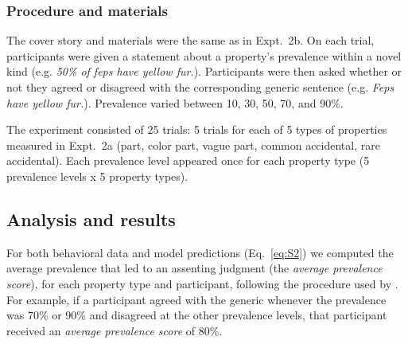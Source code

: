\documentclass[12pt,letterpaper]{article}
\begin{document}
\subsubsection*{Procedure and materials}

The cover story and materials were the same as in Expt.~2b.
On each trial, participants were given a statement about a property's prevalence within a novel kind (e.g. \emph{50\% of feps have yellow fur.}). Participants were then asked whether or not they agreed or disagreed with the corresponding generic sentence (e.g. \emph{Feps have yellow fur.}). Prevalence varied between 10, 30, 50, 70, and 90\%.

The experiment consisted of 25 trials: 5 trials for each of 5 types of properties measured in Expt.~2a (part, color part, vague part, common accidental, rare accidental). 
Each prevalence level appeared once for each property type (5 prevalence levels x 5 property types). 

\subsection*{Analysis and results}

For both behavioral data and model predictions (Eq.~\ref{eq:S2}) we computed the average prevalence that led to an assenting judgment (the \emph{average prevalence score}), for each property type and participant, following the procedure used by .
For example, if a participant agreed with the generic whenever the prevalence was 70\% or 90\% and disagreed at the other prevalence levels, that participant received an \emph{average prevalence score} of 80\%.
\end{document}
